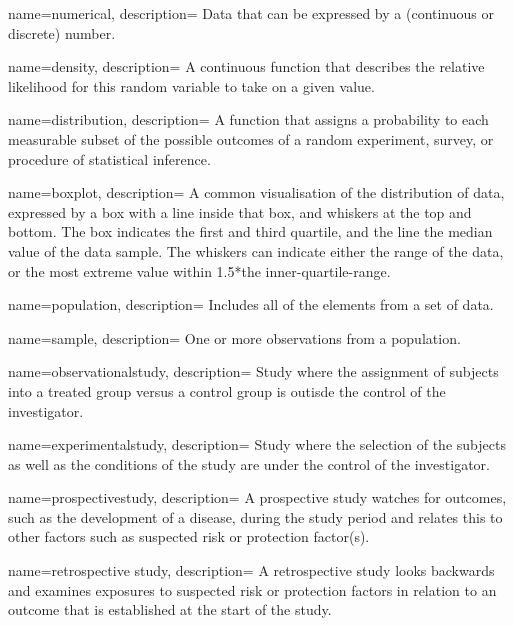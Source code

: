{
    name=numerical,
    description={ Data that can be expressed by a (continuous or discrete)
    number.}
}

{
    name=density,
    description={ A continuous function that describes the relative likelihood for this
    random variable to take on a given value.}
}

{
    name=distribution,
    description={ A function that assigns a probability to each measurable subset of the
    possible outcomes of a random experiment, survey, or procedure of
    statistical inference.}
}

{
    name=boxplot,
    description={ A common visualisation of the distribution of data, expressed by a box
    with a line inside that box, and whiskers at the top and bottom.
    The box indicates the first and third quartile, and the line the median
    value of the data sample. The whiskers can indicate either the range of
    the data, or the most extreme value within 1.5*the inner-quartile-range.}
}

{
    name=population,
    description={ Includes all of the elements from a set of data.}
}

{
    name=sample,
    description={ One or more observations from a population.}
}

{
    name=observationalstudy,
    description={ Study where the assignment of subjects into a treated group versus a
    control group is outisde the control of the investigator.}
}

{
    name=experimentalstudy,
    description={ Study where the selection of the subjects as well as the conditions of the
    study are under the control of the investigator.}
}

{
    name=prospectivestudy,
    description={ A prospective study watches for outcomes, such as the development of a
    disease, during the study period and relates this to other factors such as
    suspected risk or protection factor(s).}
}

{
    name=retrospective study,
    description={ A retrospective study looks backwards and examines exposures to suspected
    risk or protection factors in relation to an outcome that is established
    at the start of the study. }
}

